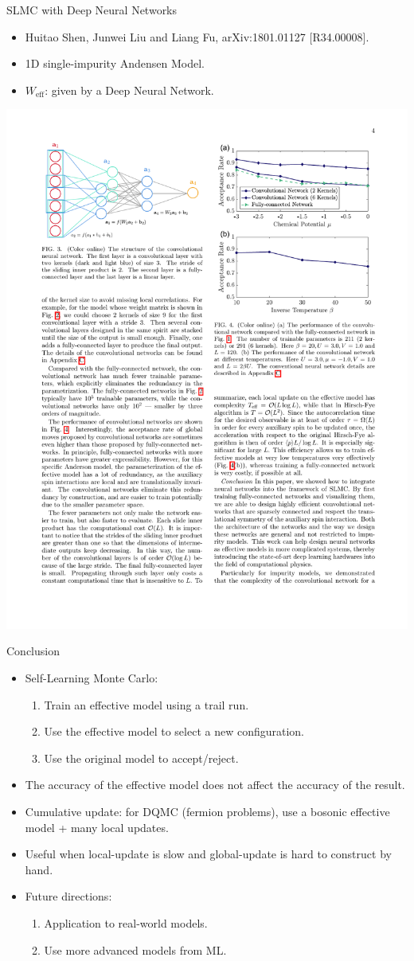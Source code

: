 \documentclass[xcolor=table, 10pt, aspectratio=169]{beamer}
\begin{document}
\begin{frame}{SLMC with Deep Neural Networks}
\begin{itemize}
	\item Huitao Shen, Junwei Liu and Liang Fu, arXiv:1801.01127 [R34.00008].
	\item 1D single-impurity Andensen Model.
	\item $W_{\text{eff}}$: given by a Deep Neural Network.
\end{itemize}
\begin{center}
	\includegraphics[width=.6\textwidth]{dnn}
\end{center}
\end{frame}

\begin{frame}{Conclusion}
	\begin{itemize}
		\item Self-Learning Monte Carlo:
		\begin{enumerate}
			\item Train an effective model using a trail run.
			\item Use the effective model to select a new configuration.
			\item Use the original model to accept/reject.
		\end{enumerate}
		\item The accuracy of the effective model does not affect the accuracy of the result.
		\item Cumulative update: for DQMC (fermion problems), use a bosonic effective model + many local updates.
		\item Useful when local-update is slow and global-update is hard to construct by hand.
		\item Future directions:
		\begin{enumerate}
			\item Application to real-world models.
			\item Use more advanced models from ML.
		\end{enumerate}
	\end{itemize}
\end{frame}
\end{document}
